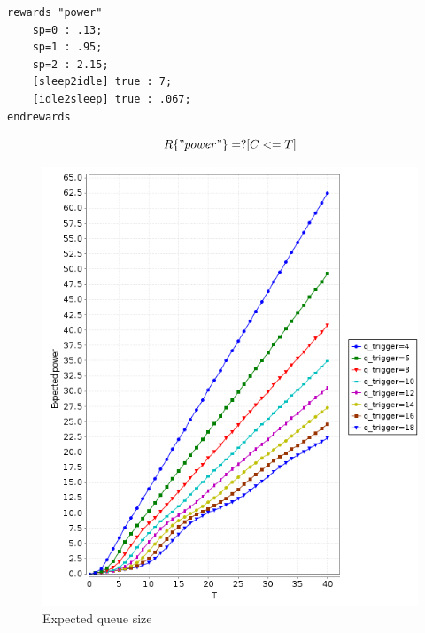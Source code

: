 \begin{verbatim}
rewards "power"
	sp=0 : .13;
	sp=1 : .95;
	sp=2 : 2.15;
	[sleep2idle] true : 7;
	[idle2sleep] true : .067;
endrewards
\end{verbatim}
\begin{displaymath}
  R\{"power"\}=? [ C<=T ]
\end{displaymath}
\begin{figure}[htb]
  \centering
  \includegraphics[width=13cm]{quantitative-project/expected-power.png}
  \caption{Expected queue size}
  \label{fig:expected-queue-size}
\end{figure}






